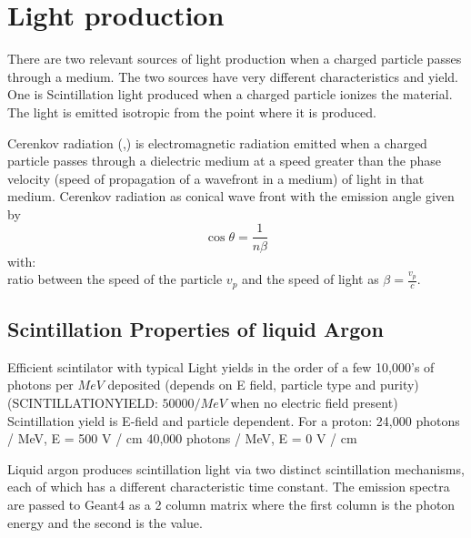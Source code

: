 \documentclass[a4paper]{jpconf}
\begin{document}
  \section{Light production}
  There are two relevant sources of light production when a charged particle passes through a medium. The two sources have very different characteristics and yield. One is Scintillation light produced when a
  charged particle ionizes the material. The light is emitted isotropic from the point where it is produced. 
  

  
  Cerenkov radiation (\cite{ref:pdg},\cite{ref:wikipedia}) is electromagnetic radiation emitted when a charged particle passes through a dielectric medium at a speed greater than the phase velocity
  (speed of propagation of a wavefront in a medium) of light in that medium.
  Cerenkov radiation as conical wave front with the emission angle given by 
   \begin{equation}
  \cos \theta ={\frac {1}{n\beta }}
   \end{equation}
  with:\\
   ratio between the speed of the particle $v_p$ and the speed of light as $\beta =\frac{v_p}{c}$.


  \subsection{Scintillation Properties of liquid Argon}

  Efficient scintilator with typical Light yields in the order of a few 10,000’s of photons per $MeV$  deposited (depends on E field, particle type and purity)
  (SCINTILLATIONYIELD: $50000/MeV$ when no electric field present)
Scintillation yield is E-field and particle
dependent. For a proton:
24,000 photons / MeV, E = 500 V / cm
40,000 photons / MeV, E = 0 V / cm
  
  Liquid argon produces scintillation light via two distinct scintillation mechanisms, each
  of which has a different characteristic time constant. The emission spectra are passed to Geant4
  as a 2 column matrix where the first column is the photon energy and the second is the value.
\end{document}

